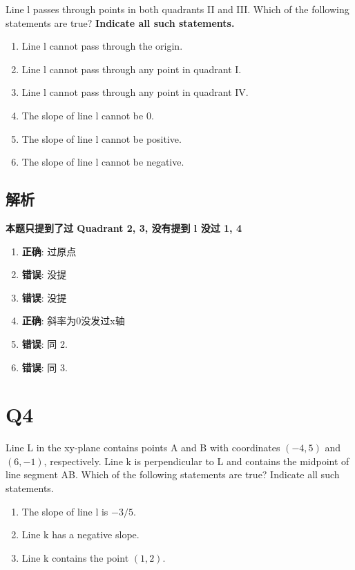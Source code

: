   Line l passes through points in both quadrants II and III.
  Which of the following statements are true?
  \textbf{Indicate all such statements.}

  \begin{enumerate}
    \item Line l cannot pass through the origin.
    \item Line l cannot pass through any point in quadrant I.
    \item Line l cannot pass through any point in quadrant IV.
    \item The slope of line l cannot be 0.
    \item The slope of line l cannot be positive.
    \item The slope of line l cannot be negative.
  \end{enumerate}

  \subsection{解析}

    \textbf{本题只提到了过 Quadrant 2, 3, 没有提到 l 没过 1, 4}

    \begin{enumerate}
      \item \textbf{正确}: 过原点
      \item \textbf{错误}: 没提
      \item \textbf{错误}: 没提
      \item \textbf{正确}: 斜率为0没发过x轴
      \item \textbf{错误}: 同 2.
      \item \textbf{错误}: 同 3.
    \end{enumerate}

\section{Q4}

  Line L in the xy-plane contains points A and B with coordinates
  $ (-4, 5) $ and $ (6, -1) $, respectively.
  Line k is perpendicular to L and contains the midpoint of line segment AB.
  Which of the following statements are true? Indicate all such statements.

  \begin{enumerate}
    \item The slope of line l is $ -3/5 $.
    \item Line k has a negative slope.
    \item Line k contains the point $ (1,2) $.
  \end{enumerate}

